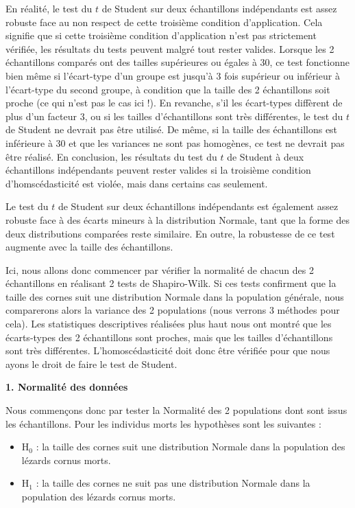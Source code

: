 \documentclass[a4paperpaper,]{article}
\providecommand{\tightlist}{%
  \setlength{\itemsep}{0pt}\setlength{\parskip}{0pt}}
\begin{document}
En réalité, le test du \(t\) de Student sur deux échantillons indépendants est assez robuste face au non respect de cette troisième condition d'application. Cela signifie que si cette troisième condition d'application n'est pas strictement vérifiée, les résultats du tests peuvent malgré tout rester valides. Lorsque les 2 échantillons comparés ont des tailles supérieures ou égales à 30, ce test fonctionne bien même si l'écart-type d'un groupe est jusqu'à 3 fois supérieur ou inférieur à l'écart-type du second groupe, à condition que la taille des 2 échantillons soit proche (ce qui n'est pas le cas ici !). En revanche, s'il les écart-types diffèrent de plus d'un facteur 3, ou si les tailles d'échantillons sont très différentes, le test du \(t\) de Student ne devrait pas être utilisé. De même, si la taille des échantillons est inférieure à 30 et que les variances ne sont pas homogènes, ce test ne devrait pas être réalisé. En conclusion, les résultats du test du \(t\) de Student à deux échantillons indépendants peuvent rester valides si la troisième condition d'homscédasticité est violée, mais dans certains cas seulement.

Le test du \(t\) de Student sur deux échantillons indépendants est également assez robuste face à des écarts mineurs à la distribution Normale, tant que la forme des deux distributions comparées reste similaire. En outre, la robustesse de ce test augmente avec la taille des échantillons.

Ici, nous allons donc commencer par vérifier la normalité de chacun des 2 échantillons en réalisant 2 tests de Shapiro-Wilk. Si ces tests confirment que la taille des cornes suit une distribution Normale dans la population générale, nous comparerons alors la variance des 2 populations (nous verrons 3 méthodes pour cela). Les statistiques descriptives réalisées plus haut nous ont montré que les écarts-types des 2 échantillons sont proches, mais que les tailles d'échantillons sont très différentes. L'homoscédasticité doit donc être vérifiée pour que nous ayons le droit de faire le test de Student.

\textbf{1. Normalité des données}

Nous commençons donc par tester la Normalité des 2 populations dont sont issus les échantillons. Pour les individus morts les hypothèses sont les suivantes :

\begin{itemize}
\tightlist
\item
  H\(_0\) : la taille des cornes suit une distribution Normale dans la population des lézards cornus morts.
\item
  H\(_1\) : la taille des cornes ne suit pas une distribution Normale dans la population des lézards cornus morts.
\end{itemize}
\end{document}
